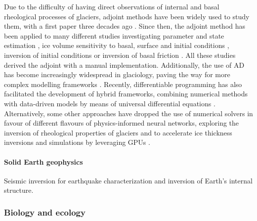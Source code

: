 Due to the difficulty of having direct observations of internal and basal rheological processes of glaciers, adjoint methods have been widely used to study them, with a first paper three decades ago \cite{macayeal1992basal}. 
Since then, the adjoint method has been applied to many different studies investigating parameter and state estimation \cite{goldberg2013parameter}, ice volume sensitivity to basal, surface and initial conditions \cite{heimbach2009greenland}, inversion of initial conditions \cite{mosbeux2016comparison} or inversion of basal friction \cite{morlighem2013inversion}.
All these studies derived the adjoint with a manual implementation. 
Additionally, the use of AD has become increasingly widespread in glaciology, paving the way for more complex modelling frameworks \cite{hascoet2018source, logan2020sicopolis}. 
Recently, differentiable programming has also facilitated the development of hybrid frameworks, combining numerical methods with data-driven models by means of universal differential equations \cite{BolibarSapienza_UDEs}. 
Alternatively, some other approaches have dropped the use of numerical solvers in favour of different flavours of physics-informed neural networks, exploring the inversion of rheological properties of glaciers \cite{wang2022discovering} and to accelerate ice thickness inversions and simulations by leveraging GPUs \cite{Jouvet_Cordonnier_Kim_Lüthi_Vieli_Aschwanden_2021, jouvet2023inversion}. 

\paragraph{Solid Earth geophysics}

Seismic inversion \cite{Zhu_Xu_Darve_Beroza_2021} for earthquake characterization and inversion of Earth's internal structure.

\subsubsection{Biology and ecology}


